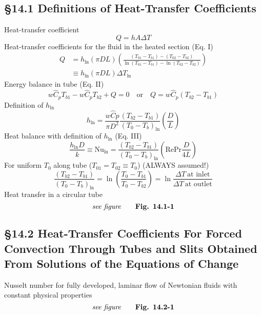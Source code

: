 \subsection{\S14.1 Definitions of Heat-Transfer Coefficients}
Heat-transfer coefficient
\[
	Q=hA\Delta T\tag{14.1-1}
\]
Heat-transfer coefficients for the fluid in the heated section (Eq. I)
\begin{align*}
	Q&=h_{\ln}(\pi DL)\left(\frac{(T_{01}-T_{b1})-(T_{02}-T_{b2})}{\ln(T_{01}-T_{b1})-\ln(T_{02}-T_{b2})}\right)\\
	&\equiv h_{\ln}(\pi DL)\Delta T_{\ln}\tag{14.1-4}
\end{align*}
Energy balance in tube (Eq. II)
\[
	w\hat{C}_pT_{b1} - w\hat{C}_pT_{b2} + Q=0 \quad \text{or} \quad Q=w\hat{C}_p(T_{b2}-T_{b1})\tag{14.1-10} 
\]
Definition of $h_{\ln}$
\[
	h_{\ln}=\frac{w\hat{C}{p}}{\pi D^2}\frac{(T_{b2}-T_{b1})}{(T_0-T_b)_{\ln}}\left(\frac{D}{L}\right)\tag{14.1-14}
\]
Heat balance with definition of $h_{\ln}$ (Eq. III)
\[
	\frac{h_{\ln}D}{k} \equiv \text{Nu}_{\ln}=\frac{(T_{b2}-T_{b1})}{(T_0-T_b)_{\ln}}\left(\text{Re}\text{Pr}\frac{D}{4L}\right)\tag*{Lecture notes 15.2}
\]
For uniform $T_0$ along tube ($T_{01}=T_{02}\equiv T_0$) (ALWAYS assumed!)
\[
	\frac{(T_{b2}-T_{b1})}{(T_0-T_b)_{\ln}}=\ln\left(\frac{T_0-T_{b1}}{T_0-T_{b2}}\right)=\ln\frac{\Delta T \ \text{at inlet}}{\Delta T \ \text{at outlet}}\tag*{Lecture notes 15.2}
\]
Heat transfer in a circular tube
\[
\textit{see figure}\tag*{\textbf{Fig. 14.1-1}}
\]
\subsection{\S14.2 Heat-Transfer Coefficients For Forced Convection Through Tubes and Slits Obtained From Solutions of the Equations of Change}
Nusselt number for fully developed, laminar flow of Newtonian fluids with constant physical properties
\[
	\textit{see figure}\tag*{\textbf{Fig. 14.2-1}}
\]
